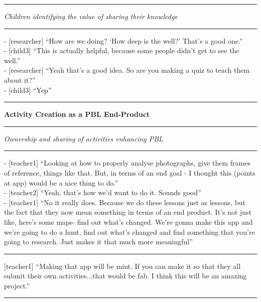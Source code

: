 \par\noindent\rule{\textwidth}{1pt}

\textit{Children identifying the value of sharing their knowledge}

\par\noindent\rule{\textwidth}{1pt}

- [researcher] “How are we doing? ‘How deep is the well?’ That’s a good one.”\\
- [child3] “This is actually helpful, because some people didn’t get to see the well.”\\
- [researcher] “Yeah that’s a good idea. So are you making a quiz to teach them about it?”\\
- [child3] “Yep”

\par\noindent\rule{\textwidth}{1pt}

\textbf{Activity Creation as a PBL End-Product}

\par\noindent\rule{\textwidth}{1pt}

\textit{Ownership and sharing of activities enhancing PBL }

\par\noindent\rule{\textwidth}{1pt}

- [teacher1] “Looking at how to properly analyse photographs, give them frames of reference, things like that. But, in terms of an end goal - I thought this (points at app) would be a nice thing to do.”\\
- [teacher2] “Yeah, that’s how we’d want to do it. Sounds good”\\
- [teacher1] “No it really does. Because we do these lessons just as lessons, but the fact that they now mean something in terms of an end product. It’s not just like, here’s some maps- find out what’s changed. We’re gonna make this app and we’re going to do a hunt, find out what’s changed and find something that you’re going to research. Just makes it that much more meaningful”\\

{\centering
  \noindent\rule{0.5\textwidth}{0.4pt}\par
}

[teacher1] “Making that app will be mint. If you can make it so that they all submit their own activities...that would be fab. I think this will be an amazing project.”

\par\noindent\rule{\textwidth}{1pt}

